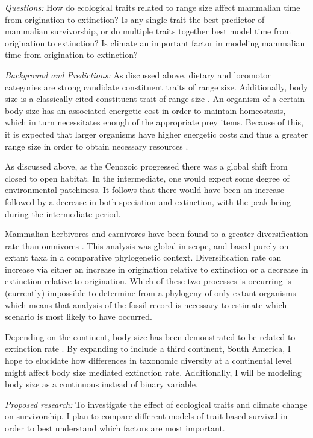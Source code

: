 \documentclass[12pt,letterpaper]{article}
\begin{document}
\textit{Questions:} 
How do ecological traits related to range size affect mammalian time from origination to extinction? Is any single trait the best predictor of mammalian survivorship, or do multiple traits together best model time from origination to extinction? Is climate an important factor in modeling mammalian time from origination to extinction?

\textit{Background and Predictions:} 
As discussed above, dietary and locomotor categories are strong candidate constituent traits of range size. Additionally, body size is a classically cited constituent trait of range size \citep{Smith2004,Smith2008b,Damuth1981a,Damuth1979}. An organism of a certain body size has an associated energetic cost in order to maintain homeostasis, which in turn necessitates enough of the appropriate prey items. Because of this, it is expected that larger organisms have higher energetic costs and thus a greater range size in order to obtain necessary resources \citep{Damuth1979,Brown1987,Damuth1979,Lyons2010}.

As discussed above, as the Cenozoic progressed there was a global shift from closed to open habitat. In the intermediate, one would expect some degree of environmental patchiness. It follows that there would have been an increase followed by a decrease in both speciation and extinction, with the peak being during the intermediate period.

Mammalian herbivores and carnivores have been found to a greater diversification rate than omnivores \citep{Price2012}. This analysis was global in scope, and based purely on extant taxa in a comparative phylogenetic context. Diversification rate can increase via either an increase in origination relative to extinction or a decrease in extinction relative to origination. Which of these two processes is occurring is (currently) impossible to determine from a phylogeny of only extant organisms \citep{Rabosky2010a} which means that analysis of the fossil record is necessary to estimate which scenario is most likely to have occurred. 

Depending on the continent, body size has been demonstrated to be related to extinction rate \citep{Tomiya2013,Liow2008}. By expanding to include a third continent, South America, I hope to elucidate how differences in taxonomic diversity at a continental level might affect body size mediated extinction rate. Additionally, I will be modeling body size as a continuous instead of binary variable.

\textit{Proposed research:}
To investigate the effect of ecological traits and climate change on survivorship, I plan to compare different models of trait based survival in order to best understand which factors are most important.
\end{document}
